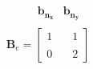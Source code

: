 \documentclass[preview]{standalone}
\begin{document}
\begin{align*}
\begin{array}{c}\begin{matrix}\hspace{1cm} \mathbf{b_{n_x}} & \mathbf{b_{n_y}} \end{matrix} \\  \mathbf{B}_e = \begin{bmatrix} 1 & \quad 1 \\ \\0 & \quad 2 \end{bmatrix} \end{array}
\end{align*}
\end{document}
